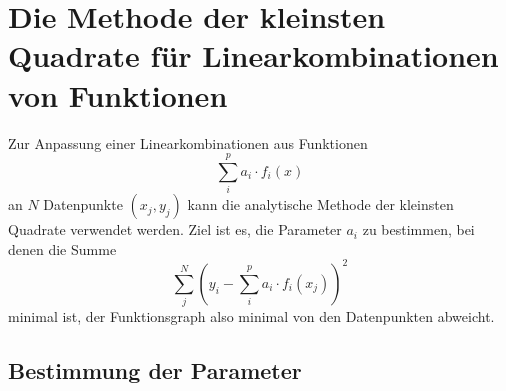 \documentclass{scrartcl}
\begin{document}
\section*{Die Methode der kleinsten Quadrate für Linearkombinationen von Funktionen}

Zur Anpassung einer Linearkombinationen aus Funktionen
\begin{equation}
  \sum_i^p a_i \cdot f_i(x)
\end{equation}
an $N$ Datenpunkte $(x_j, y_j)$ kann die analytische Methode der kleinsten Quadrate verwendet werden.
Ziel ist es, die Parameter $a_i$ zu bestimmen, bei denen die Summe
\begin{equation}
  \sum_j^N\left( y_i - \sum_i^p a_i\cdot f_i(x_j)\right)^{\!\!\! 2}
\end{equation}
minimal ist, der Funktionsgraph also minimal von den Datenpunkten abweicht.

\subsection*{Bestimmung der Parameter}
\end{document}
